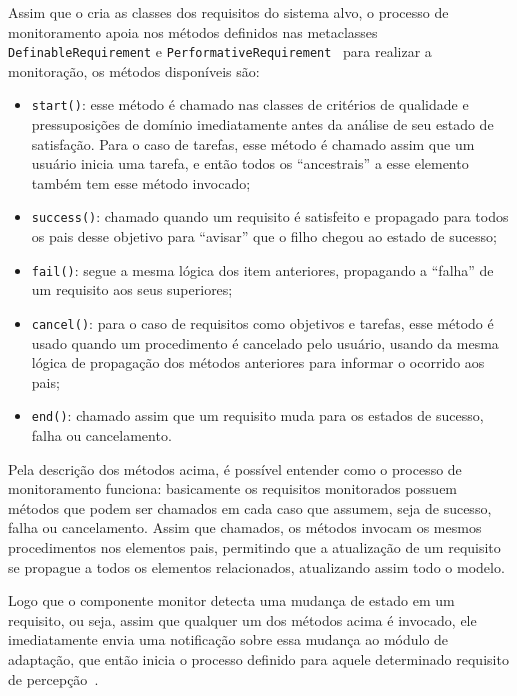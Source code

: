 Assim que o \zanshin cria as classes dos requisitos do sistema alvo, o processo de monitoramento apoia nos métodos definidos nas metaclasses \texttt{DefinableRequirement} e \texttt{PerformativeRequirement}~\cite{tesevitor} para realizar a monitoração, os métodos disponíveis são:
\begin{itemize}
	\item \texttt{start()}: esse método é chamado nas classes de critérios de qualidade e pressuposições de domínio imediatamente antes da análise de seu estado de satisfação. Para o caso de tarefas, esse método é chamado assim que um usuário inicia uma tarefa, e então todos os ``ancestrais'' a esse elemento também tem esse método invocado;
	\item \texttt{success()}: chamado quando um requisito é satisfeito e propagado para todos os pais desse objetivo para ``avisar'' que o filho chegou ao estado de sucesso;
	\item \texttt{fail()}: segue a mesma lógica dos item anteriores, propagando a ``falha'' de um requisito aos seus superiores;
	\item \texttt{cancel()}: para o caso de requisitos como objetivos e tarefas, esse método é usado quando um procedimento é cancelado pelo usuário, usando da mesma lógica de propagação dos métodos anteriores para informar o ocorrido aos pais;
	\item \texttt{end()}: chamado assim que um requisito muda para os estados de sucesso, falha ou cancelamento.
\end{itemize}

Pela descrição dos métodos acima, é possível entender como o processo de monitoramento funciona: basicamente os requisitos monitorados possuem métodos que podem ser chamados em cada caso que assumem, seja de sucesso, falha ou cancelamento. Assim que chamados, os métodos invocam os mesmos procedimentos nos elementos pais, permitindo que a atualização de um requisito se propague a todos os elementos relacionados, atualizando assim todo o modelo.

Logo que o componente monitor detecta uma mudança de estado em um requisito, ou seja, assim que qualquer um dos métodos acima é invocado, ele imediatamente envia uma notificação sobre essa mudança ao módulo de adaptação, que então inicia o processo definido para aquele determinado requisito de percepção~\cite{tesevitor}.

